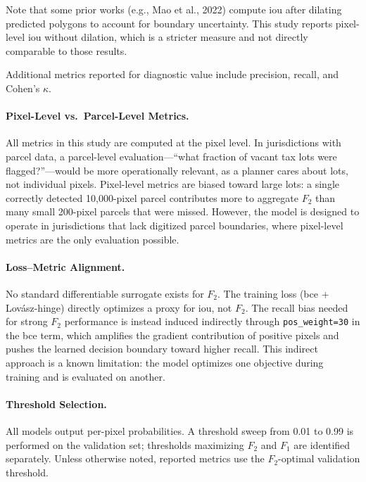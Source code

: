 Note that some prior works (e.g., Mao et al., 2022) compute \acrshort{iou} after dilating predicted polygons to account for boundary uncertainty. This study reports pixel-level \acrshort{iou} without dilation, which is a stricter measure and not directly comparable to those results.

Additional metrics reported for diagnostic value include precision, recall, and Cohen's $\kappa$.

\paragraph{Pixel-Level vs.\ Parcel-Level Metrics.}
All metrics in this study are computed at the pixel level. In jurisdictions with parcel data, a parcel-level evaluation---``what fraction of vacant tax lots were flagged?''---would be more operationally relevant, as a planner cares about lots, not individual pixels. Pixel-level metrics are biased toward large lots: a single correctly detected 10,000-pixel parcel contributes more to aggregate $F_2$ than many small 200-pixel parcels that were missed. However, the model is designed to operate in jurisdictions that lack digitized parcel boundaries, where pixel-level metrics are the only evaluation possible.

\paragraph{Loss--Metric Alignment.}
No standard differentiable surrogate exists for $F_2$. The training loss (\acrshort{bce} + Lov\'{a}sz-hinge) directly optimizes a proxy for \acrshort{iou}, not $F_2$. The recall bias needed for strong $F_2$ performance is instead induced indirectly through \texttt{pos\_weight=30} in the \acrshort{bce} term, which amplifies the gradient contribution of positive pixels and pushes the learned decision boundary toward higher recall. This indirect approach is a known limitation: the model optimizes one objective during training and is evaluated on another.

\paragraph{Threshold Selection.}
All models output per-pixel probabilities. A threshold sweep from 0.01 to 0.99 is performed on the validation set; thresholds maximizing $F_2$ and $F_1$ are identified separately. Unless otherwise noted, reported metrics use the $F_2$-optimal validation threshold.

